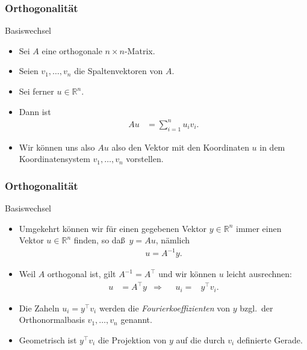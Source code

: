 \documentclass{beamer}
\renewcommand{\emph}[1]{{\textcolor{solarizedRed}{\itshape #1}}}
\newcommand\RR{\mathbb R}
\newcommand{\trans}{\top}
\renewcommand{\ae}{\"a}
\renewcommand{\oe}{\"o}
\newcommand{\ue}{\"u}
\newcommand{\mytitle}{Orthogonalit\ae t}
\begin{document}
\begin{frame}\frametitle{\mytitle}
	\begin{block}{Basiswechsel}
		\begin{itemize}
			\item Sei $A$ eine orthogonale $n\times n$-Matrix.
			\item Seien $v_1,\ldots,v_n$ die Spaltenvektoren von $A$.
			\item Sei ferner $u\in\RR^n$.
			\item Dann ist
				\begin{align*}
					Au&=\sum_{i=1}^nu_iv_i.
				\end{align*}
			\item Wir k\oe nnen uns also $Au$ also den Vektor mit den Koordinaten $u$ in dem Koordinatensystem $v_1,\ldots,v_n$ vorstellen.
		\end{itemize}
	\end{block}
\end{frame}

\begin{frame}\frametitle{\mytitle}
	\begin{block}{Basiswechsel}
		\begin{itemize}
			\item Umgekehrt k\oe nnen wir f\ue r einen gegebenen Vektor $y\in\RR^n$ immer einen Vektor $u\in\RR^n$ finden, so da\ss\ $y=Au$, n\ae mlich
				\begin{align*}
					u=A^{-1}y.
				\end{align*}
			\item Weil $A$ orthogonal ist, gilt $A^{-1}=A^\trans$ und wir k\oe nnen $u$ leicht ausrechnen:
				\begin{align*}
					u&=A^\trans y&\Rightarrow&&u_i=&y^\trans v_i.
				\end{align*}
			\item Die Zaheln $u_i=y^\trans v_i$ werden die \emph{Fourierkoeffizienten} von $y$ bzgl.\ der Orthonormalbasis $v_1,\ldots,v_n$ genannt.
			\item Geometrisch ist $y^\trans v_i$ die Projektion von $y$ auf die durch $v_i$ definierte Gerade.
		\end{itemize}
	\end{block}
\end{frame}
\end{document}
